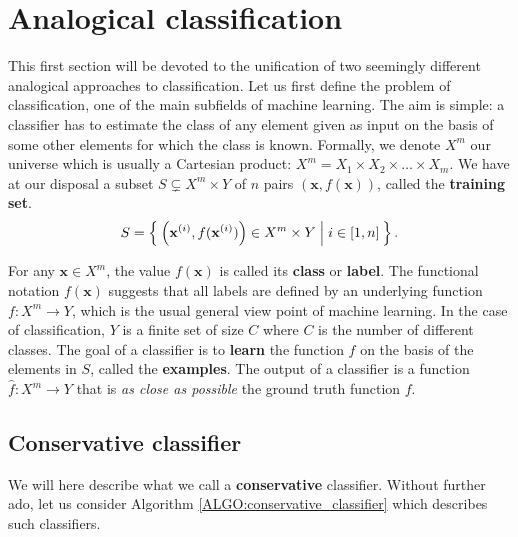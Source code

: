 \section{Analogical classification}
\label{SEC:analogical_classification}

This first section will be devoted to the unification of two seemingly
different analogical approaches to classification.  Let us first define the
problem of classification, one of the main subfields of machine learning. The
aim is simple: a classifier has to estimate the class of any element given as
input on the basis of some other elements for which the class is known.
Formally, we denote $X^m$ our universe which is usually a Cartesian product:
$X^m = X_1 \times X_2 \times \ldots \times X_m$. We have at our disposal a
subset $S \subsetneq X^m \times Y$ of $n$ pairs $\left(\mathbf{x},
f(\mathbf{x})\right)$, called the \textbf{training set}.  $$S=
\Set{\left(\mathbf{x}^{(i)}, f(\mathbf{x}^{(i)})\right) \in X^m \times Y | i
\in [1,n]}.$$

For any $\mathbf{x} \in X^m$, the value $f(\mathbf{x})$ is called its
\textbf{class} or \textbf{label}.
The functional notation $f(\mathbf{x})$ suggests that all labels
are defined by an underlying function $f \colon X^m \to Y$, which is the usual
general view point of machine learning. In the case of classification, $Y$ is a
finite set of size $C$ where $C$ is the number of different classes. The goal
of a classifier is to \textbf{learn} the function $f$ on the basis of the
elements in $S$, called the \textbf{examples}. The output of a classifier is a
function $\hat{f} \colon X^m \to Y$ that is \textit{as close as possible} the
ground truth function $f$.

\subsection{Conservative classifier}
\label{SEC:conservative_classifier}

We will here describe what we call a \textbf{conservative} classifier. Without
further ado, let us consider Algorithm \ref{ALGO:conservative_classifier} which
describes such classifiers.

